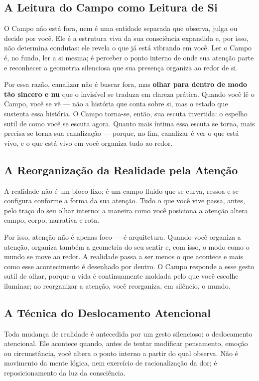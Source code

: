 \documentclass[12pt]{book}
\begin{document}
\subsection*{A Leitura do Campo como Leitura de Si}

O Campo não está fora, nem é uma entidade separada que observa, julga ou decide por você. Ele é a estrutura viva da sua consciência expandida e, por isso, não determina condutas: ele revela o que já está vibrando em você. Ler o Campo é, no fundo, ler a si mesma; é perceber o ponto interno de onde sua atenção parte e reconhecer a geometria silenciosa que sua presença organiza ao redor de si.

Por essa razão, canalizar não é buscar fora, mas \textbf{olhar para dentro de modo tão sincero e nu} que o invisível se traduza em clareza prática. Quando você lê o Campo, você se vê — não a história que conta sobre si, mas o estado que sustenta essa história. O Campo torna-se, então, sua escuta invertida: o espelho sutil de como você se escuta agora. Quanto mais íntima essa escuta se torna, mais precisa se torna sua canalização — porque, no fim, canalizar é ver o que está vivo, e o que está vivo em você organiza tudo ao redor.

\subsection*{A Reorganização da Realidade pela Atenção}

A realidade não é um bloco fixo; é um campo fluido que se curva, ressoa e se configura conforme a forma da sua atenção. Tudo o que você vive passa, antes, pelo traço do seu olhar interno: a maneira como você posiciona a atenção altera campo, corpo, narrativa e rota.

Por isso, atenção não é apenas foco — é arquitetura. Quando você organiza a atenção, organiza também a geometria do seu sentir e, com isso, o modo como o mundo se move ao redor. A realidade passa a ser menos o que acontece e mais como esse acontecimento é desenhado por dentro. O Campo responde a esse gesto sutil de olhar, porque a vida é continuamente moldada pelo que você escolhe iluminar; ao reorganizar a atenção, você reorganiza, em silêncio, o mundo.

\subsection*{A Técnica do Deslocamento Atencional}

Toda mudança de realidade é antecedida por um gesto silencioso: o deslocamento atencional. Ele acontece quando, antes de tentar modificar pensamento, emoção ou circunstância, você altera o ponto interno a partir do qual observa. Não é movimento da mente lógica, nem exercício de racionalização da dor; é reposicionamento da luz da consciência.
\end{document}

